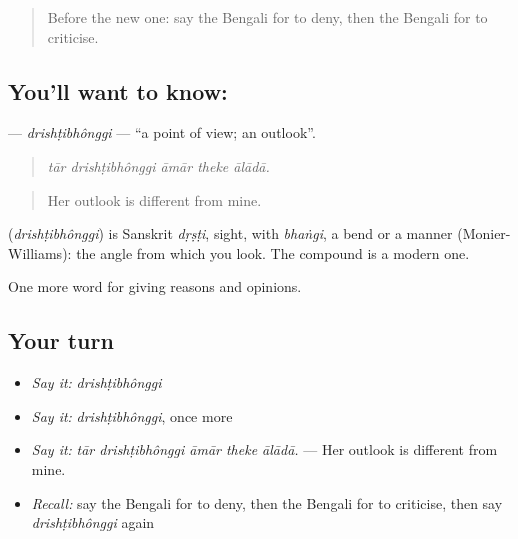 \label{lesson:BN-C335-drishtibhonggi}



\begin{quote}
Before the new one: say the Bengali for to deny, then the Bengali for to criticise.
\end{quote}

\subsection*{You'll want to know: }
\textbf{} — \emph{drishṭibhônggi} — \textquotedblleft{}a point of view; an outlook\textquotedblright{}.

\begin{quote}
    
\end{quote}

\begin{quote}
\emph{tār drishṭibhônggi āmār theke ālādā.}
\end{quote}

\begin{quote}
Her outlook is different from mine.
\end{quote}

\begin{cousinweb}
\textbf{} (\emph{drishṭibhônggi}) is Sanskrit \emph{dṛṣṭi}, sight, with \emph{bhaṅgi}, a bend or a manner (Monier-Williams): the angle from which you look. The compound is a modern one.
\end{cousinweb}

\begin{grammarlens}[title={What you've built}]
One more word for giving reasons and opinions.
\end{grammarlens}

\subsection*{Your turn}
\begin{itemize}
\raggedright
  \item \emph{Say it:} \emph{drishṭibhônggi}
  \item \emph{Say it:} \emph{drishṭibhônggi}, once more
  \item \emph{Say it:} \emph{tār drishṭibhônggi āmār theke ālādā.} — Her outlook is different from mine.
  \item \emph{Recall:} say the Bengali for to deny, then the Bengali for to criticise, then say \emph{drishṭibhônggi} again
\end{itemize}

